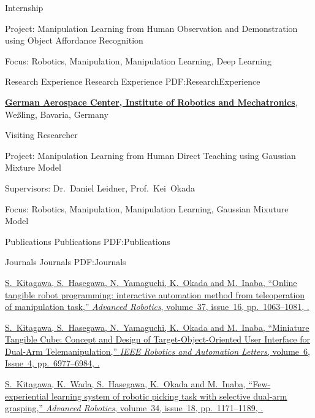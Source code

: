 \documentclass[letterpaper,MMMyyyy,nonstopmode]{simpleresumecv}
\begin{document}
\begin{Body}
\Gap
Internship
\hfill
{}
\begin{Detail}
Project:
Manipulation Learning from Human Observation and Demonstration using Object Affordance Recognition
\par
Focus:
Robotics, Manipulation, Manipulation Learning, Deep Learning
\end{Detail}
\Gap


\Section
{Research Experience}
{Research Experience}
{PDF:ResearchExperience}

\Gap
\Entry
\href{https://www.dlr.de/EN/Home/home_node.html}
{\textbf{German Aerospace Center, Institute of Robotics and Mechatronics}},
Weßling, Bavaria, Germany 
\Gap

\Gap
Visiting Researcher
\hfill
{}
\begin{Detail}
\par
Project:
Manipulation Learning from Human Direct Teaching using Gaussian Mixture Model
\par
Supervisors:
Dr.~Daniel Leidner,
Prof.~Kei~Okada
\par
Focus:
Robotics, Manipulation, Manipulation Learning, Gaussian Mixuture Model
\end{Detail}
\Gap


\Section
{Publications}
{Publications}
{PDF:Publications}

\SubSection
{Journals}
{Journals}
{PDF:Journals}

\begingroup

\BulletItem
\href{https://doi.org/10.1080/01691864.2023.2239316}
{\underline{S.~Kitagawa}, S.~Hasegawa, N.~Yamaguchi, K.~Okada and M.~Inaba,
``Online tangible robot programming: interactive automation method from teleoperation of manipulation task,''
\textit{Advanced Robotics},
volume~37,
issue~16,
pp.~1063--1081,
.}

\Gap
\BulletItem
\href{https://doi.org/10.1109/LRA.2021.3096475}
{\underline{S.~Kitagawa}, S.~Hasegawa, N.~Yamaguchi, K.~Okada and M.~Inaba,
``Miniature Tangible Cube: Concept and Design of Target-Object-Oriented User Interface for Dual-Arm Telemanipulation,''
\textit{IEEE Robotics and Automation Letters},
volume~6,
Issue~4,
pp.~6977--6984,
.}

\Gap
\BulletItem
\href{https://doi.org/10.1080/01691864.2020.1783352}
{\underline{S.~Kitagawa}, K.~Wada, S.~Hasegawa, K.~Okada and M.~Inaba,
``Few-experiential learning system of robotic picking task with selective dual-arm grasping,''
\textit{Advanced Robotics},
volume~34,
issue~18,
pp.~1171--1189,
.}


\end{Body}
\end{document}
